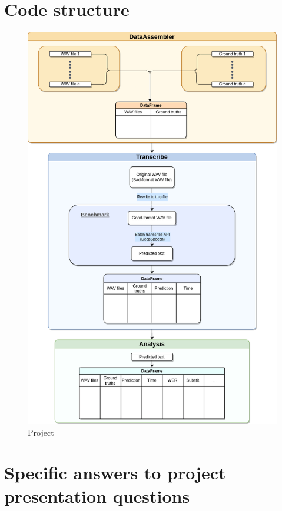 \documentclass[12pt]{article}
\begin{document}
\section{Code structure}
\begin{figure}[H]
    \centering
    \includegraphics[width=\textwidth, height=0.9\textheight]{images/speech-recognition.drawio.png}
    \caption{Project }
    \label{fig: code structure}
\end{figure}

\section{Specific answers to project presentation questions}
\end{document}
